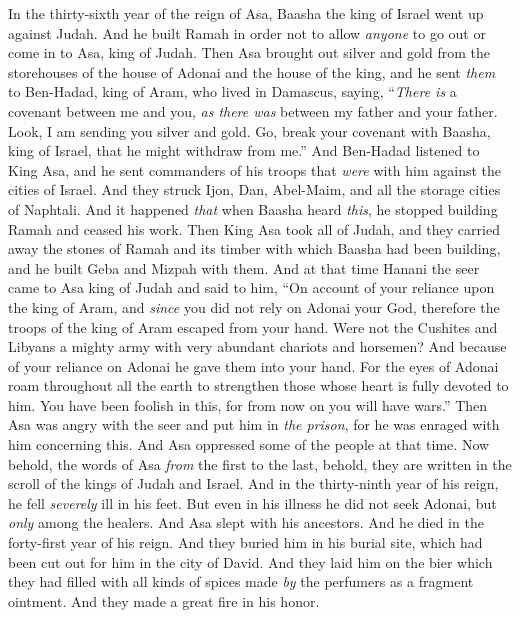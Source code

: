 \begin{biblechapter} %
 In the thirty-sixth year of the reign of Asa, Baasha the king of Israel went up against Judah. And he built Ramah in order not to allow \textit{anyone} to go out or come in to Asa, king of Judah.
\verse Then Asa brought out silver and gold from the storehouses of the house of Adonai and the house of the king, and he sent \textit{them} to Ben-Hadad, king of Aram, who lived in Damascus, saying,
\verse “\textit{There is} a covenant between me and you, \textit{as there was} between my father and your father. Look, I am sending you silver and gold. Go, break your covenant with Baasha, king of Israel, that he might withdraw from me.”
\verse And Ben-Hadad listened to King Asa, and he sent commanders of his troops that \textit{were} with him against the cities of Israel. And they struck Ijon, Dan, Abel-Maim, and all the storage cities of Naphtali.
\verse And it happened \textit{that} when Baasha heard \textit{this}, he stopped building Ramah and ceased his work.
\verse Then King Asa took all of Judah, and they carried away the stones of Ramah and its timber with which Baasha had been building, and he built Geba and Mizpah with them.
\verse And at that time Hanani the seer came to Asa king of Judah and said to him, “On account of your reliance upon the king of Aram, and \textit{since} you did not rely on Adonai your God, therefore the troops of the king of Aram escaped from your hand.
\verse Were not the Cushites and Libyans a mighty army with very abundant chariots and horsemen? And because of your reliance on Adonai he gave them into your hand.
\verse For the eyes of Adonai roam throughout all the earth to strengthen those whose heart is fully devoted to him. You have been foolish in this, for from now on you will have wars.”
\verse Then Asa was angry with the seer and put him in \textit{the prison}, for he was enraged with him concerning this. And Asa oppressed some of the people at that time.
\verse Now behold, the words of Asa \textit{from} the first to the last, behold, they are written in the scroll of the kings of Judah and Israel.
\verse And in the thirty-ninth year of his reign, he fell \textit{severely} ill in his feet. But even in his illness he did not seek Adonai, but \textit{only} among the healers.
\verse And Asa slept with his ancestors. And he died in the forty-first year of his reign.
\verse And they buried him in his burial site, which had been cut out for him in the city of David. And they laid him on the bier which they had filled with all kinds of spices made \textit{by} the perfumers as a fragment ointment. And they made a great fire in his honor.
\end{biblechapter}

